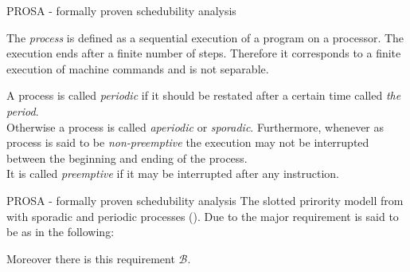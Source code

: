 \documentclass{beamer}
\begin{document}
 	
 	\begin{frame}{PROSA - formally proven schedubility analysis}
 		\begin{definition}
 		The {\itshape process} is defined as a sequential execution of a program on a processor.
 		The execution ends after a finite number of steps. 
Therefore it corresponds to a finite execution of machine commands and is not separable.\\
 		\end{definition}
	 	\begin{definition}
			A process is called {\itshape periodic} if it should be restated after a certain time called {\itshape the period}. \\
			Otherwise a process is called {\itshape aperiodic} or {\itshape sporadic}.
		Furthermore, whenever as process is said to be {\itshape non-preemptive} the execution may not be interrupted between the beginning and ending of the process. \\
		It is called {\itshape preemptive} if it may be interrupted after any instruction.
		\end{definition} 

 	\end{frame}
 	
 	\begin{frame}{PROSA - formally proven schedubility analysis}
		 	The \alert{slotted prirority modell} from \cite{B} with  sporadic and periodic processes (\cite{K}).
			Due to \cite{B} the major requirement is said to be as in the following:
			\begin{quote}
			\end{quote}
			
			Moreover there is this requirement $\mathcal{B}$.
			\begin{quote}
		\end{quote} 	
 	\end{frame}
 	
\end{document}
